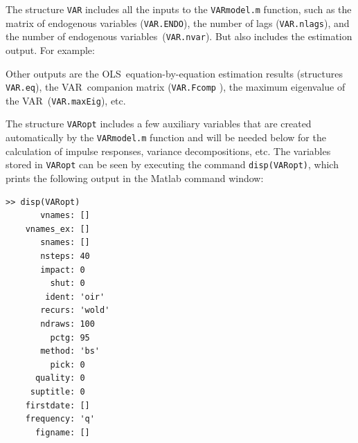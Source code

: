 \documentclass[10pt]{article}
\begin{document}
\setlength{\parindent}{.0cm}

The structure \texttt{VAR} includes all the inputs to the \texttt{VARmodel.m}
function, such as the matrix of endogenous variables (\texttt{VAR.ENDO}),
the number of lags (\texttt{VAR.nlags}), and the number of endogenous
variables\ (\texttt{VAR.nvar}). But also includes the estimation output. For
example:


Other outputs are the OLS\ equation-by-equation estimation results
(structures \texttt{VAR.eq}), the VAR\ companion matrix (\texttt{VAR.Fcomp}%
), the maximum eigenvalue of the VAR\ (\texttt{VAR.maxEig}), etc.\ 

The structure \texttt{VARopt} includes a few auxiliary variables that are
created automatically by the \texttt{VARmodel.m} function and will be needed
below for the calculation of impulse responses, variance decompositions,
etc. The variables stored in \texttt{VARopt} can be seen by executing the
command \colorbox{script!80}{\texttt{disp(VARopt)}}, which prints the
following output in the Matlab command window:
\begin{verbatim}
>> disp(VARopt)
       vnames: []
    vnames_ex: []
       snames: []
       nsteps: 40
       impact: 0
         shut: 0
        ident: 'oir'
       recurs: 'wold'
       ndraws: 100
         pctg: 95
       method: 'bs'
         pick: 0
      quality: 0
     suptitle: 0
    firstdate: []
    frequency: 'q'
      figname: []
\end{verbatim}
\end{document}
